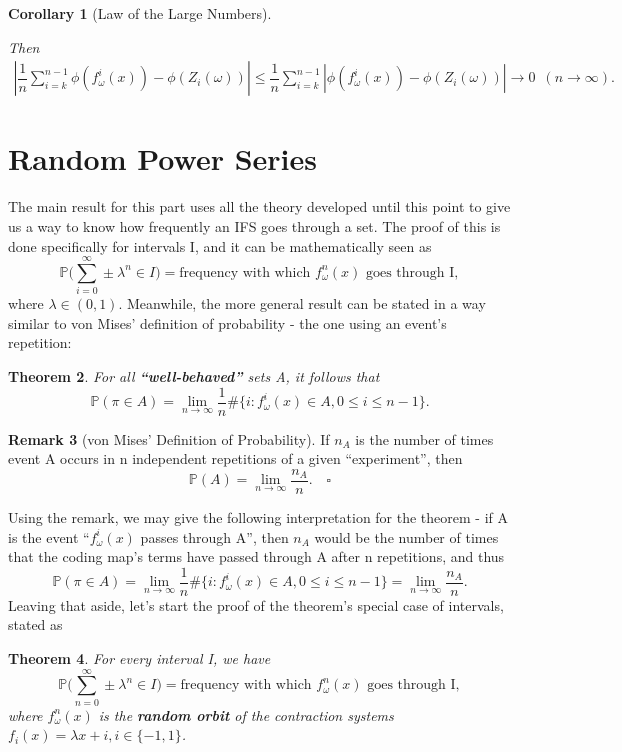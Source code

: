 \documentclass[a4paper]{article}
\theoremstyle{plain}
\newtheorem{theorem}{Theorem}[section] %
\newtheorem{corollary}[theorem]{Corollary}
\theoremstyle{definition}
\newtheorem{rem}[theorem]{Remark}
\begin{document}
\begin{corollary}[Law of the Large Numbers]
\begin{itemize}
    Then 
            \begin{align*}
\left| \dfrac{1}{n} \sum_{i=k}^{n-1} \phi (f^{i}_{\omega}(x) ) - \phi (Z_i(\omega) )  \right|
\leq 
\dfrac{1}{n} \sum_{i=k}^{n-1} \left| \phi (f^{i}_{\omega}(x) ) - \phi (Z_i(\omega) )\right| \to 0  \,\,\,(n \to \infty).
    \end{align*}
    
    \end{itemize}
    \end{corollary}

\section{Random Power Series}
  The main result for this part uses all the theory developed until this point to give us a way
to know how frequently an IFS goes through a set. The proof of this is done specifically for intervals
I, and it can be mathematically seen as 
  \[
    \boxed{\mathbb{P}\biggl(\sum\limits_{i=0}^{\infty}\pm\lambda^{n}\in I\biggr) = \text{frequency with which } f_{\omega }^{n}(x) \text{ goes through I}}, 
  \]
  where \(\lambda \in (0, 1)\). Meanwhile, the more general result can be stated in a way similar to von Mises' definition
of probability - the one using an event's repetition: 
\begin{theorem}
  For all \textbf{``well-behaved''} sets A, it follows that 
  \[
    \mathbb{P}(\pi \in A) = \lim_{n\to \infty}\frac{1}{n}\#\biggl\{i: f_{\omega }^{i}(x)\in A, 0\leq i\leq n-1\biggr\}.
  \]
\end{theorem}
\begin{rem}[von Mises' Definition of Probability]
  If \(n_{A}\) is the number of times event A occurs in n independent repetitions of a given ``experiment'', then 
  \[
    \mathbb{P}(A) = \lim_{n\to \infty} \frac{n_{A}}{n}.\quad\square
  \] 
\end{rem}
  Using the remark, we may give the following interpretation for the theorem - if A is the event ``\(f_{\omega }^{i}(x)\) passes through A'',
then \(n_{A}\) would be the number of times that the coding map's terms have passed through A after n repetitions, and thus 
  \[
    \mathbb{P}(\pi \in A) = \lim_{n\to \infty} \frac{1}{n}\#\biggl\{i: f_{\omega }^{i}(x)\in A, 0\leq i\leq n-1\biggr\} = \lim_{n\to \infty}\frac{n_{A}}{n}.
  \]
  Leaving that aside, let's start the proof of the theorem's special case of intervals, stated as 
 \begin{theorem}
   For every interval I, we have 
   \[
     \mathbb{P}\biggl(\sum\limits_{n=0}^{\infty}\pm \lambda ^{n}\in I\biggr) = \text{frequency with which } f_{\omega }^{n}(x) \text{ goes through I},
   \]
  where \(f_{\omega }^{n}(x)\) is the \textbf{random orbit} of the contraction systems \(f_{i}(x) = \lambda x + i, i\in\{-1, 1\}\).
 \end{theorem}
\end{document}
